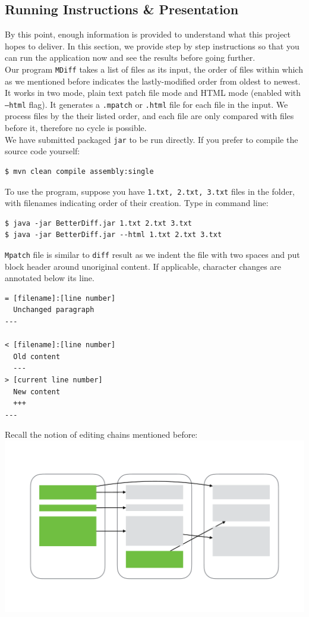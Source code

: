 \documentclass{article}
\begin{document}
\subsection{Running Instructions \& Presentation}
By this point, enough information is provided to understand what this project hopes to deliver. In this section, we provide step by step instructions so that you can run the application now and see the results before going further.\\

Our program \texttt{MDiff} takes a list of files as its input, the order of files within which as we mentioned before indicates the lastly-modified order from oldest to newest. It works in two mode, plain text patch file mode and HTML mode (enabled with \texttt{--html} flag). It generates a \texttt{.mpatch} or \texttt{.html} file for each file in the input. We process files by the their listed order, and each file are only compared with files before it, therefore no cycle is possible.\\

We have submitted packaged \texttt{jar} to be run directly. If you prefer to compile the source code yourself:
\begin{lstlisting}
$ mvn clean compile assembly:single
\end{lstlisting}

To use the program, suppose you have \texttt{1.txt, 2.txt, 3.txt} files in the folder, with filenames indicating order of their creation. Type in command line:
\begin{lstlisting}
$ java -jar BetterDiff.jar 1.txt 2.txt 3.txt
$ java -jar BetterDiff.jar --html 1.txt 2.txt 3.txt
\end{lstlisting}

\texttt{Mpatch} file is similar to \texttt{diff} result as we indent the file with two spaces and put block header around unoriginal content. If applicable, character changes are annotated below its line.
\begin{lstlisting}
= [filename]:[line number]
  Unchanged paragraph
---

< [filename]:[line number]
  Old content
  ---
> [current line number]
  New content
  +++
---
\end{lstlisting}
Recall the notion of editing chains mentioned before:\\
\includegraphics[scale=0.4,center]{1.pdf}\\
\end{document}

